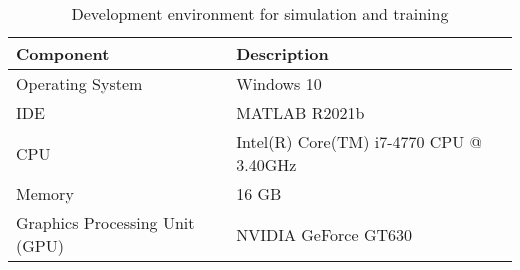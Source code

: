 \begin{table}[htbp]
    \centering
    \begin{tabular}{ll}
        \toprule
        Component        & Description                                  \\\midrule
        Operating System & Windows 10                                   \\
        \ac{IDE}              & MATLAB R2021b                           \\
        \ac{CPU}              & Intel(R) Core(TM) i7-4770 CPU @ 3.40GHz \\
        Memory                           & 16 GB                        \\
        Graphics Processing Unit (GPU)   & NVIDIA GeForce GT630         \\\bottomrule
        \end{tabular}%
    \caption{Development environment for simulation and training}
    \label{tab:env}
\end{table}